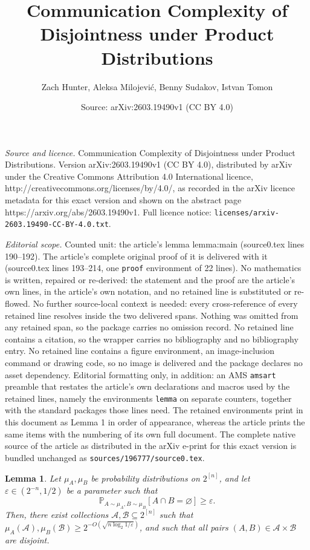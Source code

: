 \documentclass[10pt,a4paper]{amsart}
\title{\vspace{-0.9cm} Communication Complexity of Disjointness under Product Distributions}
\author{Zach Hunter, Aleksa Milojevi\'c, Benny Sudakov, Istvan Tomon}
\date{Source: arXiv:2603.19490v1 (CC BY 4.0)}
\newtheorem{lemma}{Lemma}
\def\Pb{\mathbb{P}}
\def\cA{\mathcal{A}}
\def\cB{\mathcal{B}}
\def\eps{\varepsilon}
\begin{document}
\maketitle

\noindent\emph{Source and licence.} \vspace{-0.9cm} Communication Complexity of Disjointness under Product Distributions. Version arXiv:2603.19490v1 (CC BY 4.0), distributed by arXiv under the Creative Commons Attribution 4.0 International licence, http://creativecommons.org/licenses/by/4.0/, as recorded in the arXiv licence metadata for this exact version and shown on the abstract page https://arxiv.org/abs/2603.19490v1. Full licence notice: \texttt{licenses/arxiv-2603.19490-CC-BY-4.0.txt}.\par\smallskip

\noindent\textit{Editorial scope.} Counted unit: the article's lemma lemma:main (source0.tex lines 190--192). The article's complete original proof of it is delivered with it (source0.tex lines 193--214, one \texttt{proof} environment of 22 lines). No mathematics is written, repaired or re-derived: the statement and the proof are the article's own lines, in the article's own notation, and no retained line is substituted or re-flowed.  No further source-local context is needed: every cross-reference of every retained line resolves inside the two delivered spans.  Nothing was omitted from any retained span, so the package carries no omission record.  No retained line contains a citation, so the wrapper carries no bibliography and no bibliography entry.  No retained line contains a figure environment, an image-inclusion command or drawing code, so no image is delivered and the package declares no asset dependency.  Editorial formatting only, in addition: an AMS \texttt{amsart} preamble that restates the article's own declarations and macros used by the retained lines, namely the environments \texttt{lemma} on separate counters, together with the standard packages those lines need.  The retained environments print in this document as Lemma 1 in order of appearance, whereas the article prints the same items with the numbering of its own full document.  The complete native source of the article as distributed in the arXiv e-print for this exact version is bundled unchanged as \texttt{sources/196777/source0.tex}.
\begin{lemma}\label{lemma:main}
Let $\mu_A, \mu_B$ be probability distributions on $2^{[n]}$, and let $\eps\in (2^{-n}, 1/2)$ be a parameter such that  \[\Pb_{A\sim \mu_A, B\sim \mu_B}[A\cap B=\varnothing]\geq \eps.\] Then, there exist collections $\cA, \cB\subseteq 2^{[n]}$ such that $\mu_{A}(\cA), \mu_B(\cB)\geq 2^{-O(\sqrt{n\log_2 1/\eps})}$, and such that all pairs $(A, B)\in \cA\times \cB$ are disjoint.
\end{lemma}
\end{document}
